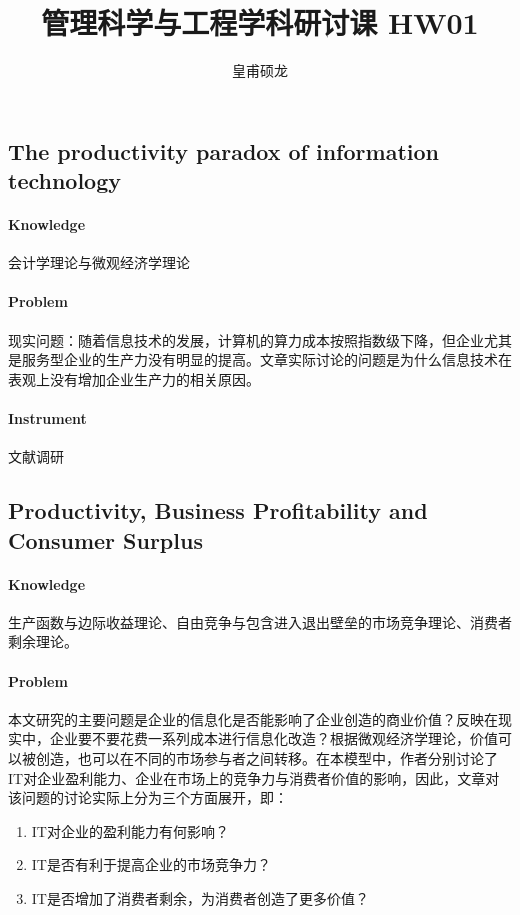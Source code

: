 \documentclass{article}
\title{管理科学与工程学科研讨课 HW01}
\author{皇甫硕龙}
\begin{document}
    \maketitle

    \subsection*{The productivity paradox of information technology}

    \paragraph*{Knowledge} 会计学理论与微观经济学理论
    \paragraph*{Problem} 现实问题：随着信息技术的发展，计算机的算力成本按照指数级下降，但企业尤其是服务型企业的生产力没有明显的提高。文章实际讨论的问题是为什么信息技术在表观上没有增加企业生产力的相关原因。
    \paragraph*{Instrument} 文献调研

    \subsection*{Productivity, Business Profitability and Consumer Surplus}

    \paragraph*{Knowledge} 生产函数与边际收益理论、自由竞争与包含进入退出壁垒的市场竞争理论、消费者剩余理论。

    \paragraph*{Problem} 本文研究的主要问题是企业的信息化是否能影响了企业创造的商业价值？反映在现实中，企业要不要花费一系列成本进行信息化改造？根据微观经济学理论，价值可以被创造，也可以在不同的市场参与者之间转移。在本模型中，作者分别讨论了IT对企业盈利能力、企业在市场上的竞争力与消费者价值的影响，因此，文章对该问题的讨论实际上分为三个方面展开，即：

    \begin{enumerate}
        \item IT对企业的盈利能力有何影响？
        \item IT是否有利于提高企业的市场竞争力？
        \item IT是否增加了消费者剩余，为消费者创造了更多价值？
    \end{enumerate}
\end{document}

